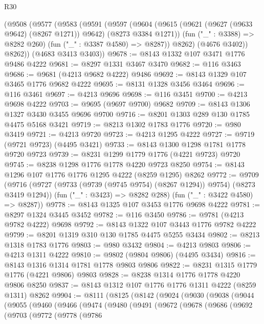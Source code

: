 \begin{lexlean}{R30}
\begin{coremodule}
    (@9508
      (@9577
        (@9583
          (@9591
            (@9597
              (@9604
                (@9615 (@9621 (@9627 (@9633 @9642) (@8267 @1271)) @9642) (@8273 @3384 @1271))
                (fun ("_" : @3388) => @8282 @260)
                (fun ("_" : @3387 @4580) => @8287))
              @8262)
            (@4676 @3402))
          @8262))
      (@4683 @3413 @3403))
@9678 := @8143 @1332 @107 @3471 @1776 @9486 @4222
@9681 := @8297 @1331 @3467 @3470
@9682 := @116 @3463
@9686 := @9681 (@4213 @9682 @4222) @9486
@9692 := @8143 @1329 @107 @3465 @1776 @9682 @4222
@9695 := @8131 @1328 @3456 @3464
@9696 := @116 @3461
@9697 := @4213 @9696
@9698 := @116 @3451
@9700 := @4213 @9698 @4222
@9703 := @9695 (@9697 @9700) @9682
@9709 := @8143 @1306 @1327 @3430 @3455 @9696 @9700
@9716 := @8201 @1303 @289 @130 @1785 @4475 @5168 @3421
@9719 := @8213 @1302 @1783 @1776
@9720 := @980 @3419
@9721 := @4213 @9720
@9723 := @4213 @1295 @4222
@9727 := @9719 (@9721 @9723) (@4495 @3421)
@9733 := @8143 @1300 @1298 @1781 @1778 @9720 @9723
@9739 := @8231 @1299 @1779 @1776 (@4221 @9723) @9720
@9745 := @8238 @1298 @1776 @1778 @4220 @9723 @8250
@9754 := @8143 @1296 @107 @1776 @1776 @1295 @4222 (@8259 @1295) @8262
@9772 := @9709
    (@9716
      (@9727 (@9733 (@9739 (@9745 @9754) (@8267 @1294)) @9754) (@8273 @3419 @1294))
      (fun ("_" : @3423) => @8282 @288)
      (fun ("_" : @3422 @4580) => @8287))
@9778 := @8143 @1325 @107 @3453 @1776 @9698 @4222
@9781 := @8297 @1324 @3445 @3452
@9782 := @116 @3450
@9786 := @9781 (@4213 @9782 @4222) @9698
@9792 := @8143 @1322 @107 @3443 @1776 @9782 @4222
@9799 := @8201 @1319 @310 @130 @1785 @4475 @5255 @3434
@9802 := @8213 @1318 @1783 @1776
@9803 := @980 @3432
@9804 := @4213 @9803
@9806 := @4213 @1311 @4222
@9810 := @9802 (@9804 @9806) (@4495 @3434)
@9816 := @8143 @1316 @1314 @1781 @1778 @9803 @9806
@9822 := @8231 @1315 @1779 @1776 (@4221 @9806) @9803
@9828 := @8238 @1314 @1776 @1778 @4220 @9806 @8250
@9837 := @8143 @1312 @107 @1776 @1776 @1311 @4222 (@8259 @1311) @8262
@9904 := @8111
    (@8125
      (@8142
        (@9024
          (@9030
            (@9038
              (@9044
                (@9055
                  (@9460
                    (@9466
                      (@9474
                        (@9480
                          (@9491
                            (@9672
                              (@9678
                                (@9686
                                  (@9692
                                    (@9703
                                      (@9772
                                        (@9778
                                          (@9786

\end{coremodule}
\end{lexlean}
